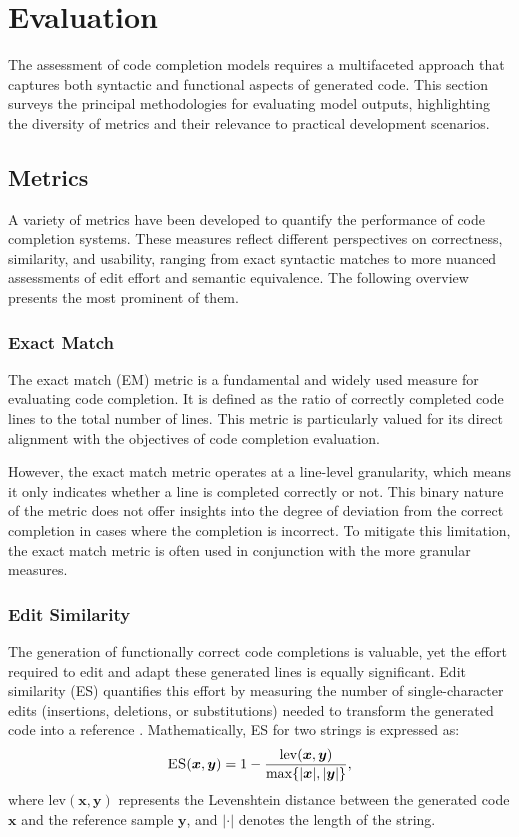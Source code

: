 \section{Evaluation}

The assessment of code completion models requires a multifaceted approach that captures both syntactic and functional aspects of generated code. This section surveys the principal methodologies for evaluating model outputs, highlighting the diversity of metrics and their relevance to practical development scenarios.

\subsection{Metrics}

A variety of metrics have been developed to quantify the performance of code completion systems. These measures reflect different perspectives on correctness, similarity, and usability, ranging from exact syntactic matches to more nuanced assessments of edit effort and semantic equivalence. The following overview presents the most prominent of them.

\subsubsection*{Exact Match}

The exact match (EM) metric is a fundamental and widely used measure for evaluating code completion. It is defined as the ratio of correctly completed code lines to the total number of lines. This metric is particularly valued for its direct alignment with the objectives of code completion evaluation.

However, the exact match metric operates at a line-level granularity, which means it only indicates whether a line is completed correctly or not. This binary nature of the metric does not offer insights into the degree of deviation from the correct completion in cases where the completion is incorrect. To mitigate this limitation, the exact match metric is often used in conjunction with the more granular measures.

\subsubsection*{Edit Similarity}

The generation of functionally correct code completions is valuable, yet the effort required to edit and adapt these generated lines is equally significant. Edit similarity (ES) quantifies this effort by measuring the number of single-character edits (insertions, deletions, or substitutions) needed to transform the generated code into a reference \parencite{svyatkovskiy2020}. Mathematically, ES for two strings is expressed as:
\begin{equation}
    \text{\textsc{ES}}(\bm{x}, \bm{y}) = 1 - \frac{\mathrm{lev}(\bm{x}, \bm{y})}{\max\{|\bm{x}|, |\bm{y}|\}},
\end{equation}
where \(\mathrm{lev}(\bm{x}, \bm{y})\) represents the Levenshtein distance between the generated code \(\bm{x}\) and the reference sample \(\bm{y}\), and \(|\cdot|\) denotes the length of the string.

